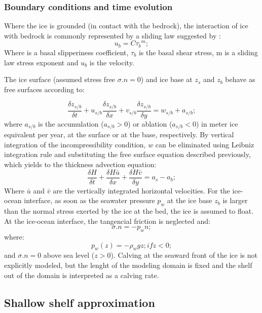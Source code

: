 \documentclass{article}
\begin{document}
\subsubsection{Boundary conditions and time evolution}
Where the ice is grounded (in contact with the bedrock), the interaction of ice with bedrock is commonly represented by a sliding law suggested by \cite{weertman1974stability}:
\begin{equation}
	u_b=C{\tau_b}^m;
\end{equation}
Where is a basal slipperiness coefficient, $\tau_b$ is the basal shear stress, m is a sliding law stress exponent and $u_b$ is the velocity. 

The ice surface (assumed stress free $\sigma .n=0$) and ice base at $z_s$ and $z_b$ behave as free surfaces according to:

\begin{equation}
	\frac{\delta z_{s/b}}{\delta t}+u_{s/b}\frac{\delta z_{s/b}}{\delta x}+v_{s/b}\frac{\delta z_{s/b}}{\delta y}=w_{s/b}+a_{s/b};
\end{equation}
where $a_{s/b}$ is the accumulation ($a_{s/b}>0$) or ablation ($a_{s/b}<0$) in meter ice equivalent per year, at the surface or at the base, respectively. By vertical integration of the incompressibility condition, $w$ can be eliminated using Leibniz integration rule and substituting the free surface equation described previously, which yields to the thickness advection equation:
\begin{equation}
	\frac{\delta H}{\delta t}+\frac{\delta H\bar{u}}{\delta x}+\frac{\delta H \bar{v}}{\delta y}=a_s-a_b ;
\end{equation}
Where $\bar{u}$ and $\bar{v}$ are the vertically integrated horizontal velocities. 
For the ice-ocean interface, as soon as the seawater pressure $p_w$ at the ice base $z_b$ is larger than the normal stress exerted by the ice at the bed, the ice is assumed to float. At the ice-ocean interface, the tangencial friction is neglected and:
\begin{equation}
	\sigma . n=-p_wn ;
\end{equation}
where:
\begin{equation}
	p_w(z)=-\rho_wgz; if z<0;
\end{equation}
and $\sigma .n=0$ above sea level ($z>0$). Calving at the seaward front of the ice is not explicitly modeled, but the lenght of the modeling domain is fixed and the shelf out of the domain is interpreted as a calving rate.
  
\subsection{Shallow shelf approximation}
\end{document}
